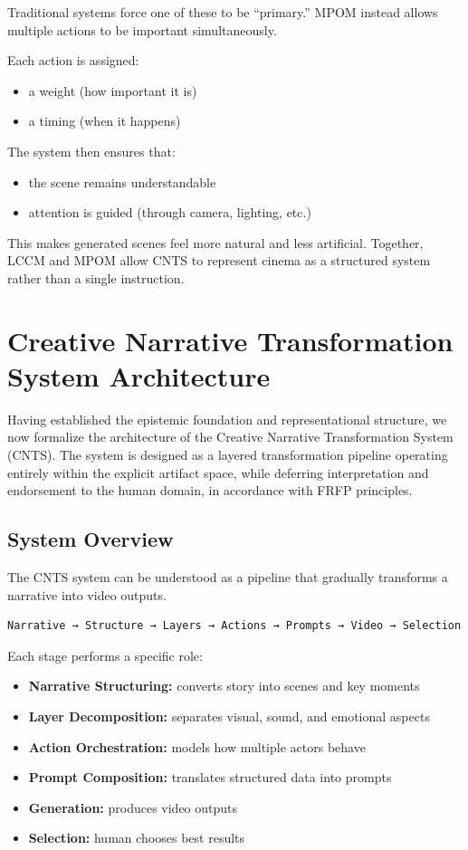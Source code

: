 \documentclass[preprints,article,submit,pdftex,moreauthors,accept]{Definitions/mdpi}
\begin{document}
Traditional systems force one of these to be ``primary.'' MPOM instead allows multiple actions to be important simultaneously.

Each action is assigned:
\begin{itemize}
    \item a weight (how important it is)
    \item a timing (when it happens)
\end{itemize}

The system then ensures that:
\begin{itemize}
    \item the scene remains understandable
    \item attention is guided (through camera, lighting, etc.)
\end{itemize}

This makes generated scenes feel more natural and less artificial.
Together, LCCM and MPOM allow CNTS to represent cinema as a structured system rather than a single instruction.
\section{Creative Narrative Transformation System Architecture}

Having established the epistemic foundation and representational structure, we now formalize the architecture of the Creative Narrative Transformation System (CNTS). The system is designed as a layered transformation pipeline operating entirely within the explicit artifact space, while deferring interpretation and endorsement to the human domain, in accordance with FRFP principles.

\subsection{System Overview}

The CNTS system can be understood as a pipeline that gradually transforms a narrative into video outputs.

\begin{verbatim}
Narrative → Structure → Layers → Actions → Prompts → Video → Selection
\end{verbatim}

Each stage performs a specific role:

\begin{itemize}
    \item \textbf{Narrative Structuring:} converts story into scenes and key moments
    \item \textbf{Layer Decomposition:} separates visual, sound, and emotional aspects
    \item \textbf{Action Orchestration:} models how multiple actors behave
    \item \textbf{Prompt Composition:} translates structured data into prompts
    \item \textbf{Generation:} produces video outputs
    \item \textbf{Selection:} human chooses best results
\end{itemize}
\end{document}
